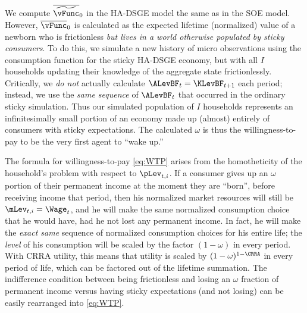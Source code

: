We compute $\overline{\widetilde{\vFunc}}_0$ in the HA-DSGE model the same as in the SOE
model.  However, $\overline{\vFunc}_0$ is calculated as the expected lifetime (normalized) value
of a newborn who is frictionless \textit{but lives in a world otherwise populated by sticky consumers}. To do
this, we simulate a new history of micro observations using the consumption function for the
sticky HA-DSGE economy, but with all $I$ households updating their knowledge of the aggregate
state frictionlessly.  Critically, we \textit{do not} actually calculate $\ALevBF_t = \KLevBF_{t+1}$
each period; instead, we use the \textit{same sequence} of $\ALevBF_t$ that occurred in the
ordinary sticky simulation.  Thus our simulated population of $I$ households represents an infinitesimally
small portion of an economy made up (almost) entirely of consumers with sticky expectations.  The
calculated $\omega$ is thus the willingness-to-pay to be the very first agent to ``wake up.''

The formula for willingness-to-pay \eqref{eq:WTP} arises from the homotheticity of the household's
problem with respect to $\pLev_{t,i}$.  If a consumer gives up an $\omega$ portion of their permanent
income at the moment they are ``born'', before receiving income that period, then his normalized market
resources will still be $\mLev_{t,i} = \Wage_t$, and he will make the same normalized consumption
choice that he would have, had he not lost any permanent income.  In fact, he will make the \textit{exact same}
sequence of normalized consumption choices for his entire life; the \textit{level} of his consumption will
be scaled by the factor $(1-\omega)$ in every period.  With CRRA utility, this means that utility is scaled
by $(1-\omega)^{1-\CRRA}$ in every period of life, which can be factored out of the lifetime summation.
The indifference condition between being frictionless and losing an $\omega$ fraction of permanent income
versus having sticky expectations (and not losing) can be easily rearranged into \eqref{eq:WTP}.
